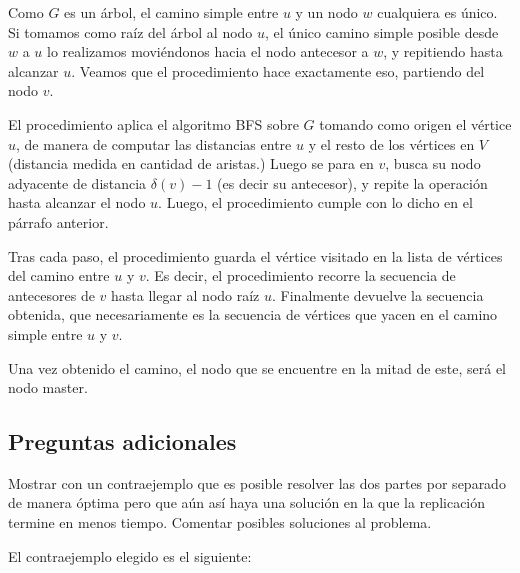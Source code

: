 \documentclass[a4paper, 10pt, twoside]{article}
\begin{document}
Como $G$ es un árbol, el camino simple entre $u$ y un nodo $w$ cualquiera es único. Si tomamos como raíz del árbol al nodo $u$, el único camino simple posible desde $w$ a $u$ lo realizamos moviéndonos hacia el nodo antecesor a $w$, y repitiendo hasta alcanzar $u$. Veamos que el procedimiento hace exactamente eso, partiendo del nodo $v$.

El procedimiento aplica el algoritmo BFS sobre $G$ tomando como origen el vértice $u$, de manera de computar las distancias entre $u$ y el resto de los vértices en $V$ (distancia medida en cantidad de aristas.) Luego se para en $v$, busca su nodo adyacente de distancia $\delta(v) - 1$ (es decir su antecesor), y repite la operación hasta alcanzar el nodo $u$. Luego, el procedimiento cumple con lo dicho en el párrafo anterior.

Tras cada paso, el procedimiento guarda el vértice visitado en la lista de vértices del camino entre $u$ y $v$. Es decir, el procedimiento recorre la secuencia de antecesores de $v$ hasta llegar al nodo raíz $u$. Finalmente devuelve la secuencia obtenida, que necesariamente es la secuencia de vértices que yacen en el camino simple entre $u$ y $v$.

Una vez obtenido el camino, el nodo que se encuentre en la mitad de este, será el nodo master.


\subsection{Preguntas adicionales}

Mostrar con un contraejemplo que es posible resolver las dos partes por separado de manera óptima pero que aún así haya una solución en la que la replicación termine en menos tiempo. Comentar posibles soluciones al problema.

El contraejemplo elegido es el siguiente:
\end{document}
